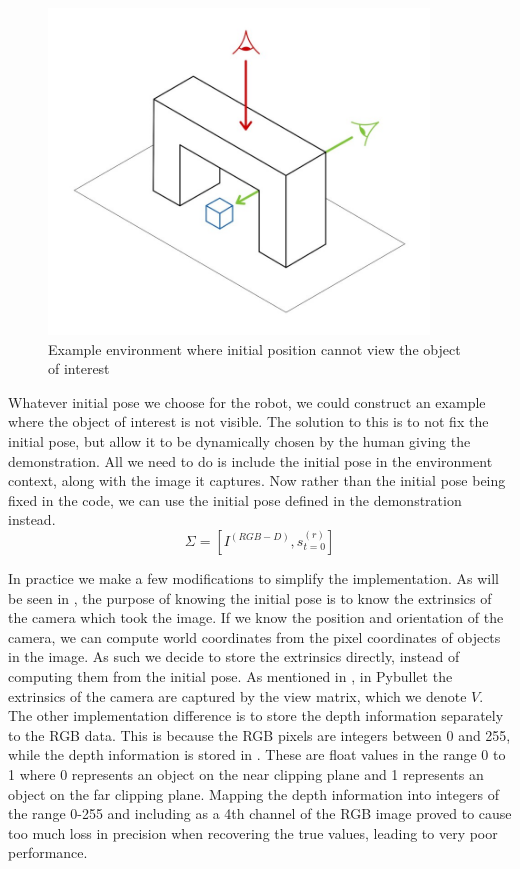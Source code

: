 \begin{figure}[h]
    \centering
    \includegraphics[width=0.9\textwidth]{figures/occluded-no-bg.jpg}
    \caption{Example environment where initial position cannot view the object of interest}
    \label{fig:occluded}
\end{figure}

Whatever initial pose we choose for the robot, we could construct an example where the object of interest is not visible. The solution to this is to not fix the initial pose, but allow it to be dynamically chosen by the human giving the demonstration. All we need to do is include the initial pose in the environment context, along with the image it captures. Now rather than the initial pose being fixed in the code, we can use the initial pose defined in the demonstration instead.
$$\Sigma = [I^{(RGB-D)}, s^{(r)}_{t=0}]$$

In practice we make a few modifications to simplify the implementation. As will be seen in , the purpose of knowing the initial pose is to know the extrinsics of the camera which took the image. If we know the position and orientation of the camera, we can compute world coordinates from the pixel coordinates of objects in the image. As such we decide to store the extrinsics directly, instead of computing them from the initial pose. As mentioned in , in Pybullet the extrinsics of the camera are captured by the view matrix, which we denote $V$.\\

The other implementation difference is to store the depth information separately to the RGB data. This is because the RGB pixels are integers between 0 and 255, while the depth information is stored in  \cite{ndc}. These are float values in the range 0 to 1 where 0 represents an object on the near clipping plane and 1 represents an object on the far clipping plane. Mapping the depth information into integers of the range 0-255 and including as a 4th channel of the RGB image proved to cause too much loss in precision when recovering the true values, leading to very poor performance.\\

